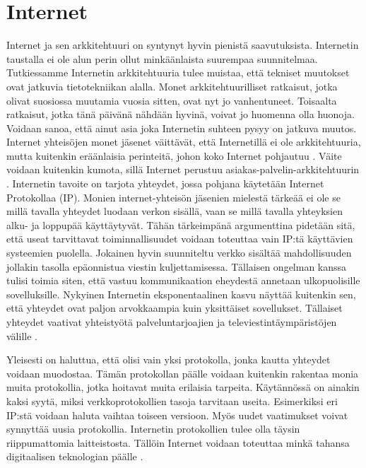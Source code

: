 \documentclass[utf8]{gradu3}
\begin{document}
\chapter{Internet}
Internet ja sen arkkitehtuuri on syntynyt hyvin pienistä saavutuksista. Internetin taustalla ei ole alun perin ollut minkäänlaista suurempaa suunnitelmaa. Tutkiessamme Internetin arkkitehtuuria tulee muistaa, että tekniset muutokset ovat jatkuvia tietotekniikan alalla. Monet arkkitehtuurilliset ratkaisut, jotka olivat suosiossa muutamia vuosia sitten, ovat nyt jo vanhentuneet. Toisaalta ratkaisut, jotka tänä päivänä nähdään hyvinä, voivat jo huomenna olla huonoja. Voidaan sanoa, että ainut asia joka Internetin suhteen pysyy on jatkuva muutos. Internet yhteisöjen monet jäsenet väittävät, että Internetillä ei ole arkkitehtuuria, mutta kuitenkin eräänlaisia perinteitä, johon koko Internet pohjautuu \parencite{constant_change}. Väite voidaan kuitenkin kumota, sillä Internet perustuu asiakas-palvelin-arkkitehtuurin \parencite[s. 162]{Sommerville}.
Internetin tavoite on tarjota yhteydet, jossa pohjana käytetään Internet Protokollaa (IP). Monien internet-yhteisön jäsenien mielestä tärkeää ei ole se millä tavalla yhteydet luodaan verkon sisällä, vaan se millä tavalla yhteyksien alku- ja loppupää käyttäytyvät. Tähän tärkeimpänä argumenttina pidetään sitä, että useat tarvittavat toiminnallisuudet voidaan toteuttaa vain IP:tä käyttävien systeemien puolella. Jokainen hyvin suunniteltu verkko sisältää mahdollisuuden jollakin tasolla epäonnistua viestin kuljettamisessa. Tällaisen ongelman kanssa tulisi toimia siten, että vastuu kommunikaation eheydestä annetaan ulkopuolisille sovelluksille. Nykyinen Internetin eksponentaalinen kasvu näyttää kuitenkin sen, että yhteydet ovat paljon arvokkaampia kuin yksittäiset sovellukset. Tällaiset yhteydet vaativat yhteistyötä palveluntarjoajien ja televiestintäympäristöjen välille \parencite{constant_change}. 

Yleisesti on haluttua, että olisi vain yksi protokolla, jonka kautta yhteydet voidaan muodostaa. Tämän protokollan päälle voidaan kuitenkin rakentaa monia muita protokollia, jotka hoitavat muita erilaisia tarpeita. Käytännössä on ainakin kaksi syytä, miksi verkkoprotokollien tasoja tarvitaan useita. Esimerkiksi eri IP:stä voidaan haluta vaihtaa toiseen versioon. Myös uudet vaatimukset voivat synnyttää uusia protokollia. Internetin protokollien tulee olla täysin riippumattomia laitteistosta. Tällöin Internet voidaan toteuttaa minkä tahansa digitaalisen teknologian päälle \parencite{constant_change}.
\end{document}
